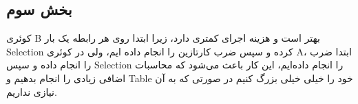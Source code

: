 \subsection*{بخش سوم}

کوئری B بهتر است و هزینه اجرای کمتری دارد، زیرا ابتدا روی هر رابطه یک بار Selection کرده و سپس ضرب کارتازین را انجام داده ایم، ولی در کوئری A، ابتدا ضرب را انجام داده و سپس Selection را انجام داده‌ایم، این کار باعث می‌شود که محاسبات اضافی زیادی را انجام بدهیم و Table خود را خیلی خیلی بزرگ کنیم در صورتی که به آن نیازی نداریم. 

